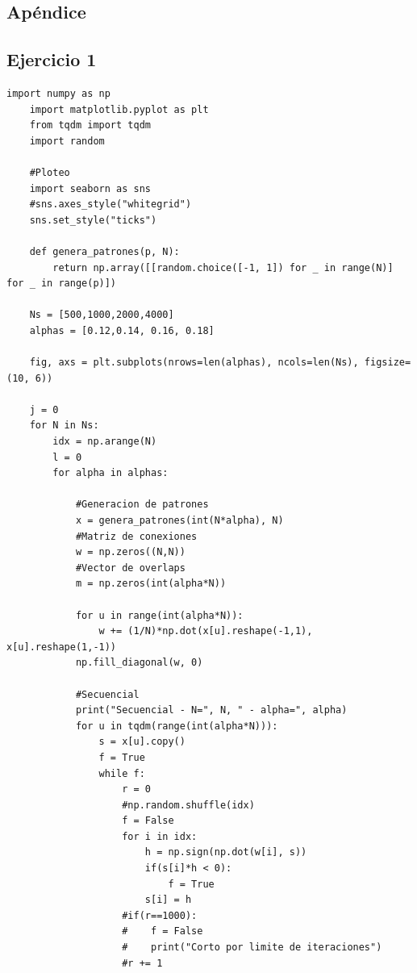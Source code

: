 \documentclass[11pt,twocolumn,twoside]{opticajnl}
\begin{document}
\begin{onecolumn} %
\appendix
\section{Apéndice \label{codigo}}

\scriptsize
\subsection{Ejercicio 1}
\begin{lstlisting}[style=mystyle]
    import numpy as np
    import matplotlib.pyplot as plt
    from tqdm import tqdm
    import random
    
    #Ploteo 
    import seaborn as sns
    #sns.axes_style("whitegrid")
    sns.set_style("ticks")
    
    def genera_patrones(p, N):
        return np.array([[random.choice([-1, 1]) for _ in range(N)] for _ in range(p)])
    
    Ns = [500,1000,2000,4000]
    alphas = [0.12,0.14, 0.16, 0.18]
    
    fig, axs = plt.subplots(nrows=len(alphas), ncols=len(Ns), figsize=(10, 6))
    
    j = 0
    for N in Ns:
        idx = np.arange(N)
        l = 0
        for alpha in alphas:
    
            #Generacion de patrones
            x = genera_patrones(int(N*alpha), N)
            #Matriz de conexiones
            w = np.zeros((N,N))
            #Vector de overlaps
            m = np.zeros(int(alpha*N))
    
            for u in range(int(alpha*N)):
                w += (1/N)*np.dot(x[u].reshape(-1,1), x[u].reshape(1,-1))
            np.fill_diagonal(w, 0)
    
            #Secuencial
            print("Secuencial - N=", N, " - alpha=", alpha) 
            for u in tqdm(range(int(alpha*N))):
                s = x[u].copy()
                f = True
                while f:
                    r = 0 
                    #np.random.shuffle(idx)
                    f = False
                    for i in idx:
                        h = np.sign(np.dot(w[i], s))
                        if(s[i]*h < 0):
                            f = True
                        s[i] = h
                    #if(r==1000):
                    #    f = False
                    #    print("Corto por limite de iteraciones")
                    #r += 1
    

\end{lstlisting}
\end{onecolumn}
\end{document}
